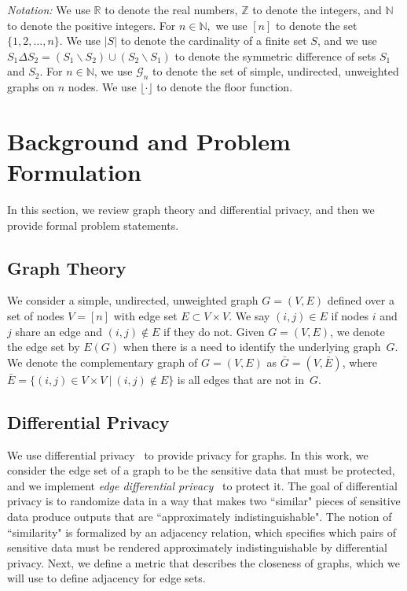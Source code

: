 \documentclass[conference]{ieeeconf}
\newcommand{\G}{\mathcal{G}}
\begin{document}
\textit{Notation:} We use $\mathbb{R}$ to denote the real numbers, $\mathbb{Z}$
to denote the integers, and $\mathbb{N}$ to denote the positive integers. 
For $n\in \mathbb{N},$ we use $[n]$ to denote the set $\{1,2, \dots, n\}$. We use $|S|$ to denote the cardinality of a finite set $S$, and we use $S_1\Delta S_2=(S_1\backslash S_2) \cup (S_2\backslash S_1)$ to denote the symmetric difference of sets $S_1$ and $S_2$. For $n\in \mathbb{N}$, we use $\G_n$ to denote the set of 
simple, undirected, unweighted graphs on $n$ nodes. We use $\lfloor \cdot \rfloor$ to denote the floor function.

\section{Background and Problem Formulation} \label{sec:II}
In this section, we review graph theory and differential privacy, and then we provide formal problem statements.

\subsection{Graph Theory}
We consider a simple, undirected, unweighted graph $G=(V,E)$ defined over a set of nodes $V=[n]$ with edge set $E \subset V \times V$. We say $(i,j) \in E$ if nodes $i$ and $j$ share an edge and $(i,j) \notin E$ if they do not.
Given $G=(V,E)$, we denote the edge set by $E(G)$ when there is a need to identify the underlying graph~$G$. 
We denote the complementary graph of $G=(V,E)$ as $\bar{G}=(V,\bar E)$, where~$\bar E=\{(i,j)\in V\times V\ |\ (i,j)\notin E\}$
is all edges that are not in~$G$. 
 
\subsection{Differential Privacy}
We use differential privacy~\cite{dwork2014algorithmic} to provide privacy for graphs. In this work, we consider the edge set of a graph to be the sensitive data that must be protected, and we implement \emph{edge differential privacy}~\cite{hay2009accurate}
to protect it. The goal of differential privacy is to 
randomize data in a way that
makes two ``similar" pieces of sensitive data produce outputs that are ``approximately indistinguishable". The notion of ``similarity" is formalized by an adjacency relation, which specifies 
which pairs of sensitive data must be rendered approximately indistinguishable by differential privacy. 
Next, we define a metric that describes the closeness of graphs, which we will use to define adjacency for edge sets.
\end{document}
